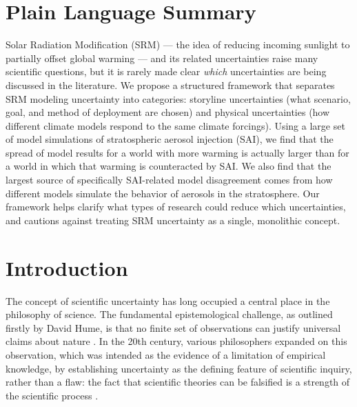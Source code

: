 \documentclass[draft]{agujournal2019}
\begin{document}
\section*{Plain Language Summary}
Solar Radiation Modification (SRM) --- the idea of reducing incoming sunlight to partially offset global warming --- and its related uncertainties raise many scientific questions, but it is rarely made clear \emph{which} uncertainties are being discussed in the literature. We propose a structured framework that separates SRM modeling uncertainty into categories: storyline uncertainties (what scenario, goal, and method of deployment are chosen) and physical uncertainties (how different climate models respond to the same climate forcings). Using a large set of model simulations of stratospheric aerosol injection (SAI), we find that the spread of model results for a world with more warming is actually larger than for a world in which that warming is counteracted by SAI. We also find that the largest source of specifically SAI-related model disagreement comes from how different models simulate the behavior of aerosols in the stratosphere. Our framework helps clarify what types of research could reduce which uncertainties, and cautions against treating SRM uncertainty as a single, monolithic concept.



\section{Introduction}

The concept of scientific uncertainty has long occupied a central place in the philosophy of science. The fundamental epistemological challenge, as outlined firstly by David Hume, is that no finite set of observations can justify universal claims about nature \cite{Rosenberg_1993}. In the 20th century, various philosophers expanded on this observation, which was intended as the evidence of a limitation of empirical knowledge, by establishing uncertainty as the defining feature of scientific inquiry, rather than a flaw: the fact that scientific theories can be falsified is a strength of the scientific process \cite{popper2005logic,lakatos1974popper,Slavov2018-SLAHTP}.
\end{document}
